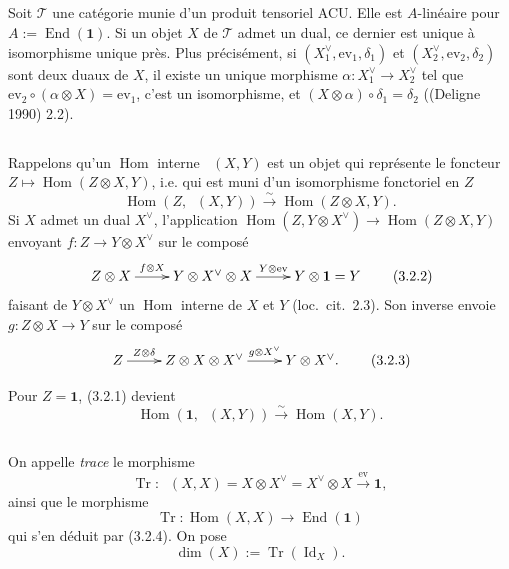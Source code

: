 \documentclass[11pt,a4paper]{article}
\theoremstyle{plain}
\theoremstyle{definition}
\DeclareMathOperator{\Hom}{Hom}
\DeclareMathOperator{\End}{End}
\DeclareMathOperator{\Tr}{Tr}
\newcommand{\isom}{\xrightarrow{\sim}}
\newcommand{\ev}{\mathrm{ev}}
\DeclareMathOperator{\Id}{Id}
\DeclareMathOperator{\iHom}{\underline{Hom}}
\begin{document}
\subsection{}
Soit $\mathcal{T}$ une cat\'egorie munie d'un produit tensoriel ACU. Elle est $A$-lin\'eaire pour $A := \End(\mathbf{1})$. Si un objet $X$ de $\mathcal{T}$ admet un dual, ce dernier est unique \`a isomorphisme unique pr\`es. Plus pr\'ecis\'ement, si $(X_1^\vee, \ev_1, \delta_1)$ et $(X_2^\vee, \ev_2, \delta_2)$ sont deux duaux de $X$, il existe un unique morphisme $\alpha : X_1^\vee \to X_2^\vee$ tel que $\ev_2 \circ (\alpha \otimes X) = \ev_1$, c'est un isomorphisme, et $(X \otimes \alpha) \circ \delta_1 = \delta_2$ ((Deligne 1990) 2.2).

\subsection{}
Rappelons qu'un $\Hom$ interne $\iHom(X, Y)$ est un objet qui repr\'esente le foncteur $Z \mapsto \Hom(Z \otimes X, Y)$, i.e. qui est muni d'un isomorphisme fonctoriel en $Z$
\begin{equation}
\Hom(Z, \iHom(X, Y)) \isom \Hom(Z \otimes X, Y). \tag{3.2.1}
\end{equation}
Si $X$ admet un dual $X^\vee$, l'application $\Hom(Z, Y \otimes X^\vee) \to \Hom(Z \otimes X, Y)$ envoyant $f : Z \to Y \otimes X^\vee$ sur le compos\'e
\begin{equation}
\xymatrix{
Z \otimes X \ar[r]^-{f \otimes X} & Y \otimes X^\vee \otimes X \ar[r]^-{Y \otimes \ev} & Y \otimes \mathbf{1} = Y
} \tag{3.2.2}
\end{equation}
faisant de $Y \otimes X^\vee$ un $\Hom$ interne de $X$ et $Y$ (loc.~cit.~2.3). Son inverse envoie $g : Z \otimes X \to Y$ sur le compos\'e
\begin{equation}
\xymatrix{
Z \ar[r]^-{Z \otimes \delta} & Z \otimes X \otimes X^\vee \ar[r]^-{g \otimes X^\vee} & Y \otimes X^\vee.
} \tag{3.2.3}
\end{equation}

Pour $Z = \mathbf{1}$, (3.2.1) devient
\begin{equation}
\Hom(\mathbf{1}, \iHom(X, Y)) \isom \Hom(X, Y). \tag{3.2.4}
\end{equation}

\subsection{}
On appelle \emph{trace} le morphisme
\begin{equation}
\Tr : \iHom(X, X) = X \otimes X^\vee = X^\vee \otimes X \xrightarrow{\ev} \mathbf{1}, \tag{3.3.1}
\end{equation}
ainsi que le morphisme
\begin{equation}
\Tr : \Hom(X, X) \to \End(\mathbf{1}) \tag{3.3.2}
\end{equation}
qui s'en d\'eduit par (3.2.4). On pose
\begin{equation}
\dim(X) := \Tr(\Id_X). \tag{3.3.3}
\end{equation}
\end{document}
